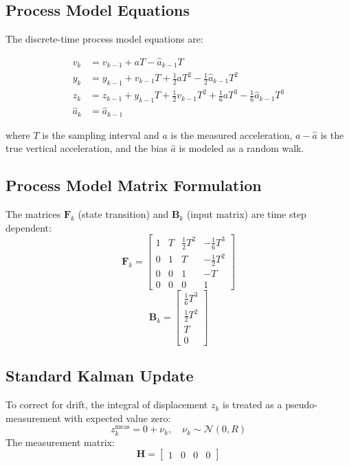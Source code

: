 \documentclass[11pt,letterpaper]{article}
\begin{document}
\subsection*{Process Model Equations}
The discrete-time process model equations are:

\begin{align}
v_k &= v_{k-1} + a T - \hat{a}_{k-1} T \\
y_k &= y_{k-1} + v_{k-1} T + \frac{1}{2}a T^2 - \frac{1}{2}\hat{a}_{k-1} T^2 \\
z_k &= z_{k-1} + y_{k-1} T + \frac{1}{2}v_{k-1} T^2 + \frac{1}{6}a T^3 - \frac{1}{6}\hat{a}_{k-1} T^3 \\
\hat{a}_k &= \hat{a}_{k-1}
\end{align}

where $T$ is the sampling interval and $a$ is the measured acceleration, $a - \hat{a}$ is the true vertical acceleration, and the bias $\hat{a}$ is modeled as a random walk.

\subsection*{Process Model Matrix Formulation}
The matrices \( \mathbf{F}_k \) (state transition) and \( \mathbf{B}_k \) (input matrix) are time step dependent:
\begin{equation}
\mathbf{F}_k =
\begin{bmatrix}
1 & T & \frac{1}{2}T^2 & -\frac{1}{6}T^3 \\
0 & 1 & T & -\frac{1}{2}T^2 \\
0 & 0 & 1 & -T \\
0 & 0 & 0 & 1
\end{bmatrix}
\end{equation}
\begin{equation}
\mathbf{B}_k =
\begin{bmatrix}
\frac{1}{6}T^3 \\
\frac{1}{2}T^2 \\
T \\
0
\end{bmatrix}
\end{equation}

\subsection*{Standard Kalman Update}
To correct for drift, the integral of displacement \( z_k \) is treated as a pseudo-measurement with expected value zero:
\begin{equation}
z_k^\text{meas} = 0 + \nu_k, \quad \nu_k \sim \mathcal{N}(0, R)
\end{equation}
The measurement matrix:
\begin{equation}
\mathbf{H} = \begin{bmatrix} 1 & 0 & 0 & 0 \end{bmatrix}
\end{equation}
\end{document}
